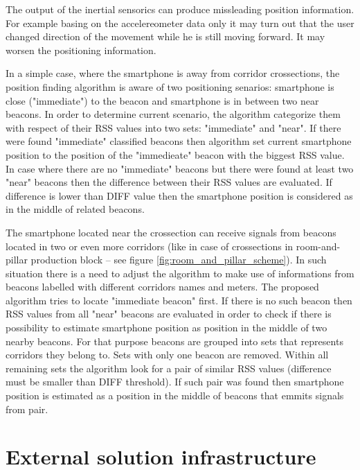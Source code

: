 \documentclass[../main.tex]{subfiles}
\begin{document}
The output of the inertial sensorics can produce missleading position information. For example basing on the accelereometer data only it may turn out that the user changed direction of the movement while he is still moving forward. It may worsen the positioning information.

In a simple case, where the smartphone is away from corridor crossections, the position finding algorithm is aware of two positioning senarios: smartphone is close ("immediate") to the beacon and smartphone is in between two near beacons. In order to determine current scenario, the algorithm categorize them with respect of their RSS values into two sets: "immediate" and "near". If there were found "immediate" classified beacons then algorithm set current smartphone position to the position of the "immedieate" beacon with the biggest RSS value. In case where there are no "immediate" beacons but there were found at least two "near" beacons then the difference between their RSS values are evaluated. If difference is lower than DIFF value then the smartphone position is considered as in the middle of related beacons.

The smartphone located near the crossection can receive signals from beacons located in two or even more corridors (like in case of crossections in room-and-pillar production block -- see figure \ref{fig:room_and_pillar_scheme}). In such situation there is a need to adjust the algorithm to make use of informations from beacons labelled with different corridors names and meters. The proposed algorithm tries to locate "immediate beacon" first. If there is no such beacon then RSS values from all "near" beacons are evaluated in order to check if there is possibility to estimate smartphone position as position in the middle of two nearby beacons. For that purpose beacons are grouped into sets that represents corridors they belong to. Sets with only one beacon are removed. Within all remaining sets the algorithm look for a pair of similar RSS values (difference must be smaller than DIFF threshold). If such pair was found then smartphone position is estimated as a position in the middle of beacons that emmits signals from pair.


\section{External solution infrastructure} %
\label{sec:external_solution_infrastructure}
\end{document}
